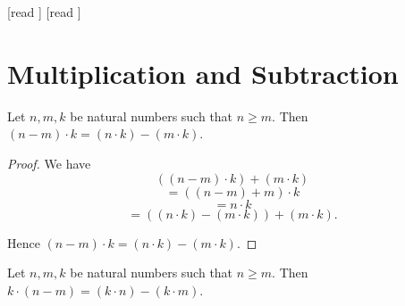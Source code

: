 \documentclass[10pt]{article}
\begin{document}
  \begin{imports}
    \begin{forthel}
      [read ]
      [read ]
    \end{forthel}
  \end{imports}


  \section*{Multiplication and Subtraction}

  \begin{forthel}
    \begin{proposition}[id=ARITHMETIC_06_5458841930039296,printid]
      Let $n, m, k$ be natural numbers such that $n \geq m$.
      Then $(n - m) \cdot k = (n \cdot k) - (m \cdot k)$.
    \end{proposition}
    \begin{proof}
      We have
      \[  ((n - m) \cdot k) + (m \cdot k)                 \]
      \[    = ((n - m) + m) \cdot k                       \]
      \[    = n \cdot k                                   \]
      \[    = ((n \cdot k) - (m \cdot k)) + (m \cdot k).  \]

      Hence $(n - m) \cdot k = (n \cdot k) - (m \cdot k)$.
    \end{proof}
  \end{forthel}

  \begin{forthel}
    \begin{corollary}[id=ARITHMETIC_06_8461123277815808,printid]
      Let $n, m, k$ be natural numbers such that $n \geq m$.
      Then $k \cdot (n - m) = (k \cdot n) - (k \cdot m)$.
    \end{corollary}
  \end{forthel}
\end{document}
